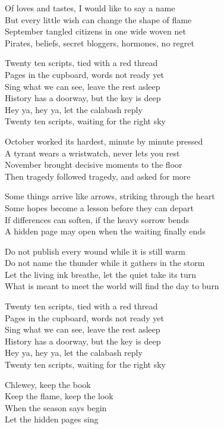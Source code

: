 \begin{lyrics}
Of loves and tastes, I would like to say a name\\
But every little wish can change the shape of flame\\
September tangled citizens in one wide woven net\\
Pirates, beliefs, secret bloggers, hormones, no regret

Twenty ten scripts, tied with a red thread\\
Pages in the cupboard, words not ready yet\\
Sing what we can see, leave the rest asleep\\
History has a doorway, but the key is deep\\
Hey ya, hey ya, let the calabash reply\\
Twenty ten scripts, waiting for the right sky

October worked its hardest, minute by minute pressed\\
A tyrant wears a wristwatch, never lets you rest\\
November brought decisive moments to the floor\\
Then tragedy followed tragedy, and asked for more

Some things arrive like arrows, striking through the heart\\
Some hopes become a lesson before they can depart\\
If differences can soften, if the heavy sorrow bends\\
A hidden page may open when the waiting finally ends

Do not publish every wound while it is still warm\\
Do not name the thunder while it gathers in the storm\\
Let the living ink breathe, let the quiet take its turn\\
What is meant to meet the world will find the day to burn

Twenty ten scripts, tied with a red thread\\
Pages in the cupboard, words not ready yet\\
Sing what we can see, leave the rest asleep\\
History has a doorway, but the key is deep\\
Hey ya, hey ya, let the calabash reply\\
Twenty ten scripts, waiting for the right sky

Chlewey, keep the book\\
Keep the flame, keep the look\\
When the season says begin\\
Let the hidden pages sing
\end{lyrics}

